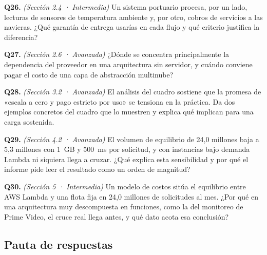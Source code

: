 \documentclass[12pt, letterpaper, table, xcdraw]{inf-pucv}
\begin{document}
\textbf{Q26.} \textit{(Sección 2.4 · Intermedia)} Un sistema portuario procesa, por un lado, lecturas de sensores de temperatura ambiente y, por otro, cobros de servicios a las navieras. ¿Qué garantía de entrega usarías en cada flujo y qué criterio justifica la diferencia?

\textbf{Q27.} \textit{(Sección 2.6 · Avanzada)} ¿Dónde se concentra principalmente la dependencia del proveedor en una arquitectura sin servidor, y cuándo conviene pagar el costo de una capa de abstracción multinube?

\textbf{Q28.} \textit{(Sección 3.2 · Avanzada)} El análisis del cuadro sostiene que la promesa de «escala a cero y pago estricto por uso» se tensiona en la práctica. Da dos ejemplos concretos del cuadro que lo muestren y explica qué implican para una carga sostenida.

\textbf{Q29.} \textit{(Sección 4.2 · Avanzada)} El volumen de equilibrio de 24,0 millones baja a 5,3 millones con 1~GB y 500~ms por solicitud, y con instancias bajo demanda Lambda ni siquiera llega a cruzar. ¿Qué explica esta sensibilidad y por qué el informe pide leer el resultado como un orden de magnitud?

\textbf{Q30.} \textit{(Sección 5 · Intermedia)} Un modelo de costos sitúa el equilibrio entre AWS Lambda y una flota fija en 24,0 millones de solicitudes al mes. ¿Por qué en una arquitectura muy descompuesta en funciones, como la del monitoreo de Prime Video, el cruce real llega antes, y qué dato acota esa conclusión?

\subsection*{Pauta de respuestas}
\end{document}
